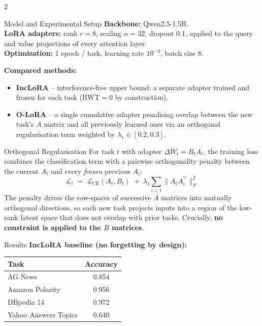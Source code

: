 \documentclass[portrait,a0,final]{a0poster}
\begin{document}
\begin{multicols}{2}
\begin{secbox}{Model and Experimental Setup}
\large
\textbf{Backbone:} Qwen2.5-1.5B.\\
\textbf{LoRA adapters:} rank $r=8$, scaling $\alpha=32$, dropout $0.1$, applied to the
query and value projections of every attention layer.\\
\textbf{Optimisation:} 1 epoch / task, learning rate $10^{-3}$, batch size $8$.

\textbf{Compared methods:}
\begin{itemize}[leftmargin=1.2em,topsep=2pt,itemsep=1pt]
  \item \textbf{IncLoRA} -- interference-free upper bound: a separate adapter trained
        and frozen for each task ($\text{BWT}=0$ by construction).
  \item \textbf{O-LoRA} -- a single cumulative adapter penalising overlap between the
        new task's $A$ matrix and all previously learned ones via an orthogonal
        regularisation term weighted by $\lambda_1 \in [0.2,0.3]$.
\end{itemize}
\end{secbox}

\begin{secbox}{Orthogonal Regularisation}
\large
For task $t$ with adapter $\Delta W_t = B_t A_t$, the training loss combines the
classification term with a pairwise orthogonality penalty between the current
$A_t$ and every \emph{frozen} previous $A_i$:
\[
\mathcal{L}_t \;=\; \mathcal{L}_{\mathrm{CE}}(A_t,B_t)
\;+\; \lambda_1 \!\!\sum_{i<t}\bigl\lVert A_t A_i^{\!\top}\bigr\rVert_F^{2}
\]
The penalty drives the row-spaces of successive $A$ matrices into mutually
orthogonal directions, so each new task projects inputs into a region of the
low-rank latent space that does not overlap with prior tasks.
Crucially, \textbf{no constraint is applied to the $B$ matrices}.
\end{secbox}

\begin{secbox}{Results}
\large
\textbf{IncLoRA baseline (no forgetting by design):}\par\smallskip
\begin{center}\normalsize
\begin{tabular}{lc}
\toprule
\textbf{Task} & \textbf{Accuracy}\\
\midrule
AG News              & 0.854\\
Amazon Polarity      & 0.956\\
DBpedia 14           & 0.972\\
Yahoo Answers Topics & 0.640\\
\bottomrule
\end{tabular}
\end{center}


\end{secbox}
\end{multicols}
\end{document}
